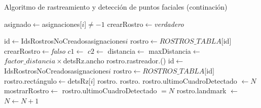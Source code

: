 \documentclass[a4paper,openright,12pt]{report}
\begin{document}
\begin{algorithm}
  \ContinuedFloat
  \caption{Algoritmo de rastreamiento y detección de puntos faciales (continación)}
  \begin{algorithmic}
          \label{lst:line:iterRostros}
            \State asignado$\leftarrow$asignaciones[$i$]$\neq-1$
            \State crearRostro$\leftarrow$\textit{verdadero}

            \label{lst:line:asignadoInit}
              \State id$\gets$IdsRostrosNoCreados\lbrack asignaciones\lbrack$i$\rbrack\rbrack
              \State rostro$\gets ROSTROS\_TABLA[$id$]$
              \State crearRostro$\gets$\textit{falso}
              \State $c1\gets$
              \State $c2\gets$
              \State distancia$\gets$
              \State maxDistancia$\gets$$factor\_distancia \times $detsRz.ancho
                \State rostro.rastreador.()
              \EndIf
            \EndIf
            \label{lst:line:asignadoFin}
              \State {}
            \Else
              \State id$\gets$IdsRostrosNoCreados\lbrack asignaciones\lbrack$i$\rbrack\rbrack
              \label{lst:line:initResetFaces}
              \State rostro$\gets ROSTROS\_TABLA[$id$]$
                \State rostro.rectángulo$\gets$detsRz[$i$]
                \State rostro.
                \State rostro.
                \State rostro.ultimoCuadroDetectado $\gets N$
              \EndIf
              \label{lst:line:endResetFaces}
            \EndIf
          \EndFor
        \EndIf
      \EndIf \label{lst:line:finFaseDetect}
        \State mostrarRostro$\gets$ rostro.ultimoCuadroDetectado $= N$
            \State rostro.landmark $\gets$ 
            \label{lst:line:estimarLandmark}
          \EndIf
          \State {}
          \label{lst:line:mostrarRostros}
        \EndIf
      \EndFor
      \State $N\gets N + 1$
    \EndProcedure
  \end{algorithmic}
\end{algorithm}
\end{document}
